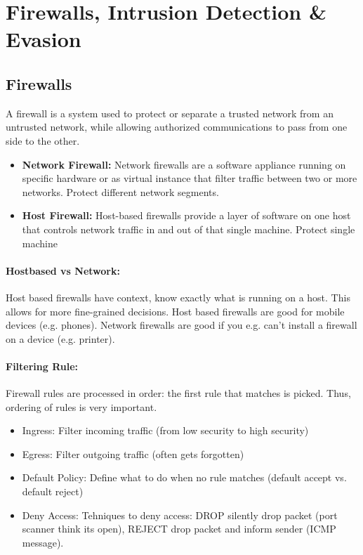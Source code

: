 \section{Firewalls, Intrusion Detection \& Evasion}

\subsection{Firewalls}

A firewall is a system used to protect or separate a trusted network from an untrusted network, while allowing authorized communications to pass from one side to the other.

\begin{itemize}
	\item \textbf{Network Firewall:} Network firewalls are a software appliance running on specific hardware or as virtual instance that filter traffic between two or more networks. Protect different network segments.
	\item \textbf{Host Firewall:} Host-based firewalls provide a layer of software on one host that controls network traffic in and out of	that single machine. Protect single machine
\end{itemize}

\paragraph{Hostbased vs Network:} Host based firewalls have context, know exactly what is running on a host. This allows for more fine-grained decisions. Host based firewalls are good for mobile devices (e.g. phones). Network firewalls are good if you e.g. can't install a firewall on a device (e.g. printer).

\paragraph{Filtering Rule:} Firewall rules are processed in order: the first rule that matches is picked. Thus, ordering of rules is very important.
\begin{itemize}
    \item Ingress: Filter incoming traffic (from low security to high security)
    \item Egress: Filter outgoing traffic (often gets forgotten)
    \item Default Policy: Define what to do when no rule matches (default accept vs. default reject)
    \item Deny Access: Tehniques to deny access: DROP silently drop packet (port scanner think its open), REJECT drop packet and inform sender (ICMP message).
\end{itemize}

